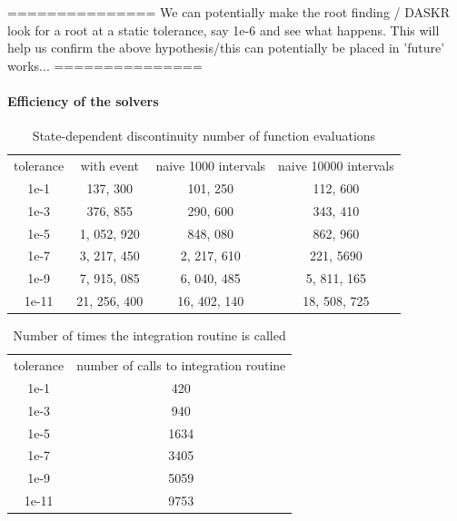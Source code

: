 \documentclass{article}
\begin{document}
===============
We can potentially make the root finding / DASKR look for a root at a static tolerance, say 1e-6 and see what happens. This will help us confirm the above hypothesis/this can potentially be placed in 'future' works...
===============

\paragraph{Efficiency of the solvers}
\begin{table}[h]
\caption {State-dependent discontinuity number of function evaluations} 
\label{tab:pde_state_tol_study}
\begin{center}
\begin{tabular}{ c c c c } 
tolerance  & with event & naive 1000 intervals & naive 10000 intervals\\ 
1e-1       & 137, 300             & 101, 250            & 112, 600   \\
1e-3       & 376, 855             & 290, 600            & 343, 410   \\
1e-5       & 1, 052, 920          & 848, 080            & 862, 960  \\
1e-7       & 3, 217, 450          & 2, 217, 610         & 221, 5690   \\
1e-9       & 7, 915, 085          & 6, 040, 485         & 5, 811, 165  \\
1e-11      & 21, 256, 400         & 16, 402, 140        & 18, 508, 725  \\
\end{tabular}
\end{center}
\end{table}

\begin{table}[h]
\caption {Number of times the integration routine is called} 
\label{tab:pde_state_tol_num_integrations}
\begin{center}
\begin{tabular}{ c c } 
tolerance  & number of calls to integration routine \\ 
1e-1       &  420 \\
1e-3       &  940 \\
1e-5       & 1634 \\
1e-7       & 3405 \\
1e-9       & 5059 \\
1e-11      & 9753 \\
\end{tabular}
\end{center}
\end{table}
\end{document}
